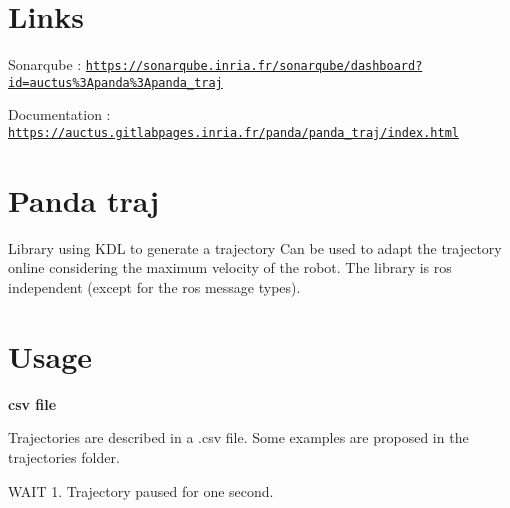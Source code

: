 \href{https://gitlab.inria.fr/auctus/panda/panda_traj/commits/master}{\tt } \href{https://sonarqube.inria.fr/sonarqube/dashboard/index/auctus:panda:panda-traj}{\tt } \href{https://sonarqube.inria.fr/sonarqube/dashboard/index/auctus:panda:panda-traj}{\tt }

\href{https://sonarqube.inria.fr/sonarqube/dashboard/index/auctus:panda:panda-traj}{\tt } \href{https://sonarqube.inria.fr/sonarqube/dashboard/index/auctus:panda:panda-traj}{\tt } \href{https://sonarqube.inria.fr/sonarqube/dashboard/index/auctus:panda:panda-traj}{\tt }

\href{https://sonarqube.inria.fr/sonarqube/dashboard/index/auctus:panda:panda-traj}{\tt } \href{https://sonarqube.inria.fr/sonarqube/dashboard/index/auctus:panda:panda-traj}{\tt }

\section*{Links}


\begin{DoxyItemize}
\item Sonarqube \+: \href{https://sonarqube.inria.fr/sonarqube/dashboard?id=auctus%3Apanda%3Apanda_traj}{\tt https\+://sonarqube.\+inria.\+fr/sonarqube/dashboard?id=auctus\%3\+Apanda\%3\+Apanda\+\_\+traj}
\item Documentation \+: \href{https://auctus.gitlabpages.inria.fr/panda/panda_traj/index.html}{\tt https\+://auctus.\+gitlabpages.\+inria.\+fr/panda/panda\+\_\+traj/index.\+html}
\end{DoxyItemize}

\section*{Panda traj}

Library using K\+DL to generate a trajectory Can be used to adapt the trajectory online considering the maximum velocity of the robot. The library is ros independent (except for the ros message types).

\section*{Usage}

{\bfseries csv file}

Trajectories are described in a .csv file. Some examples are proposed in the trajectories folder.

{\ttfamily W\+A\+IT 1.} Trajectory paused for one second.

